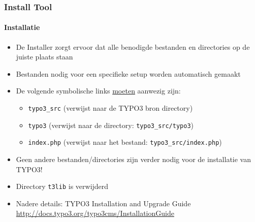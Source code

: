 
\begin{frame}[fragile]

	\frametitle{Install Tool}
	\framesubtitle{Installatie}

	\begin{itemize}
		\item De Installer zorgt ervoor dat alle benodigde bestanden en directories op de juiste plaats staan
		\item Bestanden nodig voor een specifieke setup worden automatisch gemaakt
		\item De volgende symbolische links \underline{moeten} aanwezig zijn:

		\begin{itemize}
			\item \texttt{typo3\_src}	\tabto{2cm} (verwijst naar de TYPO3 bron directory)
			\item \texttt{typo3}		\tabto{2cm} (verwijst naar de directory: \texttt{typo3\_src/typo3})
			\item \texttt{index.php}	\tabto{2cm} (verwijst naar het bestand: \texttt{typo3\_src/index.php})
		\end{itemize}

		\item Geen andere bestanden/directories zijn verder nodig voor de installatie van TYPO3!
		\item Directory \texttt{t3lib} is verwijderd
		\item Nadere details: TYPO3 Installation and Upgrade Guide\newline
			\url{http://docs.typo3.org/typo3cms/InstallationGuide}

	\end{itemize}

\end{frame}


